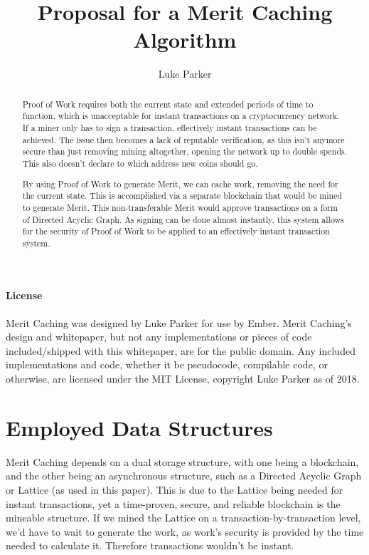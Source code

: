 \documentclass[14pt]{article}
\title{Proposal for a Merit Caching Algorithm}
\author{Luke Parker}
\begin{document}
\maketitle

\label{sec:abstract}
\begin{abstract}
Proof of Work requires both the current state and extended periods of time to function, which is unacceptable for instant transactions on a cryptocurrency network. If a miner only has to sign a transaction, effectively instant transactions can be achieved. The issue then becomes a lack of reputable verification, as this isn't anymore secure than just removing mining altogether, opening the network up to double spends. This also doesn't declare to which address new coins should go.

By using Proof of Work to generate Merit, we can cache work, removing the need for the current state. This is accomplished via a separate blockchain that would be mined to generate Merit. This non-transferable Merit would approve transactions on a form of Directed Acyclic Graph. As signing can be done almost instantly, this system allows for the security of Proof of Work to be applied to an effectively instant transaction system.
\end{abstract}

\label{sec:license}
\paragraph{License}
Merit Caching was designed by Luke Parker for use by Ember. Merit Caching's design and whitepaper, but not any implementations or pieces of code included/shipped with this whitepaper, are for the public domain. Any included implementations and code, whether it be pseudocode, compilable code, or otherwise, are licensed under the MIT License, copyright Luke Parker as of 2018.

\newpage

\label{sec:toc}
\setcounter{tocdepth}{3}
\tableofcontents

\newpage

\label{sec:1}
\section{Employed Data Structures}
Merit Caching depends on a dual storage structure, with one being a blockchain, and the other being an asynchronous structure, such as a Directed Acyclic Graph or Lattice (as used in this paper). This is due to the Lattice being needed for instant transactions, yet a time-proven, secure, and reliable blockchain is the mineable structure. If we mined the Lattice on a transaction-by-transaction level, we'd have to wait to generate the work, as work's security is provided by the time needed to calculate it. Therefore transactions wouldn't be instant.
\end{document}
